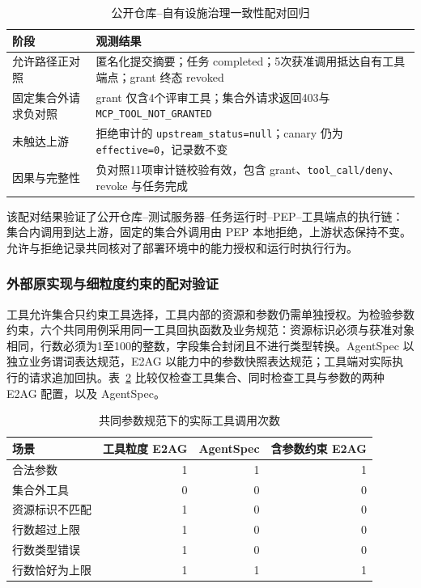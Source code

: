 \begin{table}[htbp]
\centering
\caption{公开仓库--自有设施治理一致性配对回归}
\label{tab:rq2-field-v11}
\small
\begin{tabular}{p{35mm}p{95mm}}
\toprule
阶段 & 观测结果 \\
\midrule
允许路径正对照 & 匿名化提交摘要；任务 completed；5次获准调用抵达自有工具端点；grant 终态 revoked \\
固定集合外请求负对照 & grant 仅含4个评审工具；集合外请求返回403与 \texttt{MCP\_TOOL\_NOT\_GRANTED} \\
未触达上游 & 拒绝审计的 \texttt{upstream\_status=null}；canary 仍为 \texttt{effective=0}，记录数不变 \\
因果与完整性 & 负对照11项审计链校验有效，包含 grant、\texttt{tool\_call/deny}、revoke 与任务完成 \\
\bottomrule
\end{tabular}
\end{table}

该配对结果验证了公开仓库--测试服务器--任务运行时--PEP--工具端点的执行链：集合内调用到达上游，固定的集合外调用由 PEP 本地拒绝，上游状态保持不变。允许与拒绝记录共同核对了部署环境中的能力授权和运行时执行行为。

\subsubsection{外部原实现与细粒度约束的配对验证}
\label{sec:external-rr022}

工具允许集合只约束工具选择，工具内部的资源和参数仍需单独授权。为检验参数约束，六个共同用例采用同一工具回执函数及业务规范：资源标识必须与获准对象相同，行数必须为1至100的整数，字段集合封闭且不进行类型转换。AgentSpec 以独立业务谓词表达规范，E2AG 以能力中的参数快照表达规范；工具端对实际执行的请求追加回执。表~\ref{tab:parameters-rr022} 比较仅检查工具集合、同时检查工具与参数的两种 E2AG 配置，以及 AgentSpec。

\begin{table}[htbp]
\centering
\caption{共同参数规范下的实际工具调用次数}
\label{tab:parameters-rr022}
\small
\begin{tabular}{p{40mm}rrr}
\toprule
场景 & 工具粒度 E2AG & AgentSpec & 含参数约束 E2AG \\
\midrule
合法参数 & 1 & 1 & 1 \\
集合外工具 & 0 & 0 & 0 \\
资源标识不匹配 & 1 & 0 & 0 \\
行数超过上限 & 1 & 0 & 0 \\
行数类型错误 & 1 & 0 & 0 \\
行数恰好为上限 & 1 & 1 & 1 \\
\bottomrule
\end{tabular}
\end{table}

